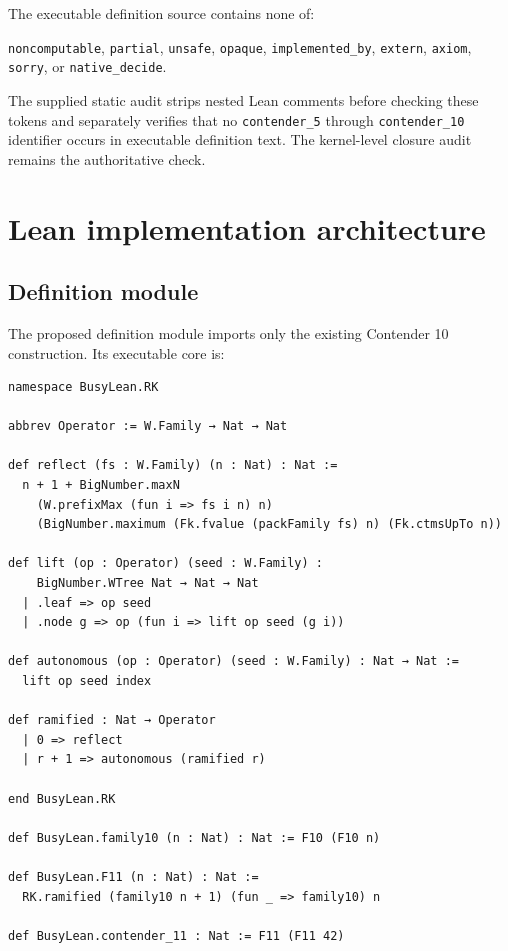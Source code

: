 \documentclass[11pt,oneside]{article}
\theoremstyle{definition}
\newcommand{\code}[1]{\texttt{#1}}
\begin{document}
The executable definition source contains none of:
\begin{center}
\code{noncomputable}, \code{partial}, \code{unsafe}, \code{opaque},
\code{implemented\_by}, \code{extern}, \code{axiom}, \code{sorry}, or
\code{native\_decide}.
\end{center}
The supplied static audit strips nested Lean comments before checking these
tokens and separately verifies that no \code{contender\_5} through
\code{contender\_10} identifier occurs in executable definition text.  The
kernel-level closure audit remains the authoritative check.

\section{Lean implementation architecture}

\subsection{Definition module}

The proposed definition module imports only the existing Contender 10
construction.  Its executable core is:

\begin{Verbatim}[fontsize=\small,breaklines=true,breakanywhere=true,
  frame=single,framesep=2mm,rulecolor=\color{Navy},bgcolor=CodeBg]
namespace BusyLean.RK

abbrev Operator := W.Family → Nat → Nat

def reflect (fs : W.Family) (n : Nat) : Nat :=
  n + 1 + BigNumber.maxN
    (W.prefixMax (fun i => fs i n) n)
    (BigNumber.maximum (Fk.fvalue (packFamily fs) n) (Fk.ctmsUpTo n))

def lift (op : Operator) (seed : W.Family) :
    BigNumber.WTree Nat → Nat → Nat
  | .leaf => op seed
  | .node g => op (fun i => lift op seed (g i))

def autonomous (op : Operator) (seed : W.Family) : Nat → Nat :=
  lift op seed index

def ramified : Nat → Operator
  | 0 => reflect
  | r + 1 => autonomous (ramified r)

end BusyLean.RK

def BusyLean.family10 (n : Nat) : Nat := F10 (F10 n)

def BusyLean.F11 (n : Nat) : Nat :=
  RK.ramified (family10 n + 1) (fun _ => family10) n

def BusyLean.contender_11 : Nat := F11 (F11 42)
\end{Verbatim}
\end{document}

